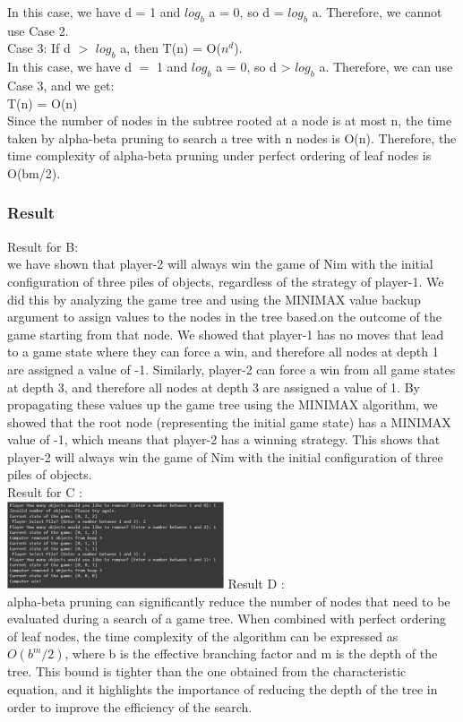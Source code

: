 \documentclass[15pt,journal]{IEEEtran}
\begin{document}
In this case, we have d = 1 and $log_b$ a = 0, so d = $log_b$ a. Therefore, we cannot use Case 2.\\

Case 3: If d $>$ $log_b$ a, then T(n) = O($n^d$).\\

In this case, we have d $=$ 1 and $log_b$ a = 0, so d > $log_b$ a. Therefore, we can use Case 3, and we get:\\

T(n) = O(n)\\

Since the number of nodes in the subtree rooted at a node is at most n, the time taken by alpha-beta pruning to search a tree with n nodes is O(n). Therefore, the time complexity of alpha-beta pruning under perfect ordering of leaf nodes is O(bm/2).\\
\subsubsection{\Large{\textbf{Result}}\\}
Result for B: \\
we have shown that player-2 will always win the game of Nim with the initial configuration of three piles of objects, regardless of the strategy of player-1. We did this by analyzing the game tree and using the MINIMAX value backup argument to assign values to the nodes in the tree based.on the outcome of the game starting from that node. We showed that player-1 has no moves that lead to a game state where they can force a win, and therefore all nodes at depth 1 are assigned a value of -1. Similarly, player-2 can force a win from all game states at depth 3, and therefore all nodes at depth 3 are assigned a value of 1. By propagating these values up the game tree using the MINIMAX algorithm, we showed that the root node (representing the initial game state) has a MINIMAX value of -1, which means that player-2 has a winning strategy. This shows that player-2 will always win the game of Nim with the initial configuration of three piles of objects.\\
Result for C :\\
\includegraphics[width=0.48\textwidth]{image/output 3.jpg}
Result D : \\
 alpha-beta pruning can significantly reduce the number of nodes that need to be evaluated during a search of a game tree. When combined with perfect ordering of leaf nodes, the time complexity of the algorithm can be expressed as $O(b^m/2)$, where b is the effective branching factor and m is the depth of the tree. This bound is tighter than the one obtained from the characteristic equation, and it highlights the importance of reducing the depth of the tree in order to improve the efficiency of the search.
\end{document}

